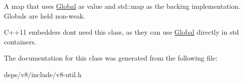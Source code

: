 A map that uses \hyperlink{classv8_1_1_global}{Global} as value and std\+::map as the backing implementation. Globals are held non-\/weak.

C++11 embedders don\textquotesingle{}t need this class, as they can use \hyperlink{classv8_1_1_global}{Global} directly in std containers. 

The documentation for this class was generated from the following file\+:\begin{DoxyCompactItemize}
\item 
deps/v8/include/v8-\/util.\+h\end{DoxyCompactItemize}
